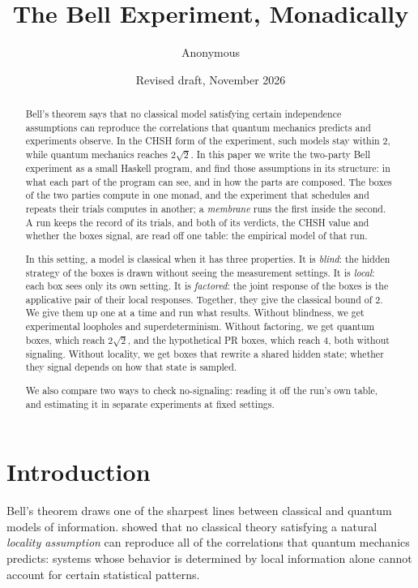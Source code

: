 \documentclass[11pt]{article}
\title{\vspace{-2.6em}\textbf{The Bell Experiment, Monadically}}
\author{Anonymous}
\date{\small Revised draft, November 2026}
\begin{document}
\maketitle

\begin{abstract}
\noindent Bell's theorem says that no classical model satisfying certain independence assumptions can reproduce the correlations that quantum mechanics predicts and experiments observe. In the CHSH form of the experiment, such models stay within $2$, while quantum mechanics reaches $2\sqrt2$. In this paper we write the two-party Bell experiment as a small Haskell program, and find those assumptions in its structure: in what each part of the program can see, and in how the parts are composed. The boxes of the two parties compute in one monad, and the experiment that schedules and repeats their trials computes in another; a \emph{membrane} runs the first inside the second. A run keeps the record of its trials, and both of its verdicts, the CHSH value and whether the boxes signal, are read off one table: the empirical model of that run.

In this setting, a model is classical when it has three properties. It is \emph{blind}: the hidden strategy of the boxes is drawn without seeing the measurement settings. It is \emph{local}: each box sees only its own setting. It is \emph{factored}: the joint response of the boxes is the applicative pair of their local responses. Together, they give the classical bound of $2$. We give them up one at a time and run what results. Without blindness, we get experimental loopholes and superdeterminism. Without factoring, we get quantum boxes, which reach $2\sqrt2$, and the hypothetical PR boxes, which reach $4$, both without signaling. Without locality, we get boxes that rewrite a shared hidden state; whether they signal depends on how that state is sampled.

We also compare two ways to check no-signaling: reading it off the run's own table, and estimating it in separate experiments at fixed settings.
\end{abstract}

\tableofcontents
\clearpage

\section{Introduction}\label{sec:intro}

Bell's theorem draws one of the sharpest lines between classical and quantum models of information. \citet{Bell1964} showed that no classical theory satisfying a natural \emph{locality assumption} can reproduce all of the correlations that quantum mechanics predicts: systems whose behavior is determined by local information alone cannot account for certain statistical patterns.
\end{document}
